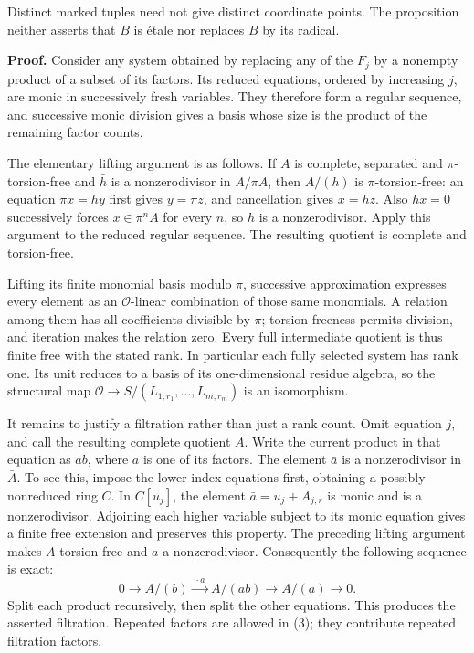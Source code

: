 \documentclass[
  british,
  10pt,
]{article}
\newcounter{none} %
\begin{document}
Distinct marked tuples need not give distinct coordinate points. The
proposition neither asserts that \(B\) is étale nor replaces \(B\) by
its radical.

\textbf{Proof.} Consider any system obtained by replacing any of the
\(F_j\) by a nonempty product of a subset of its factors. Its reduced
equations, ordered by increasing \(j\), are monic in successively fresh
variables. They therefore form a regular sequence, and successive monic
division gives a basis whose size is the product of the remaining factor
counts.

The elementary lifting argument is as follows. If \(A\) is complete,
separated and \(\pi\)-torsion-free and \(\bar h\) is a nonzerodivisor in
\(A/\pi A\), then \(A/(h)\) is \(\pi\)-torsion-free: an equation
\(\pi x=hy\) first gives \(y=\pi z\), and cancellation gives \(x=hz\).
Also \(hx=0\) successively forces \(x\in\pi^nA\) for every \(n\), so
\(h\) is a nonzerodivisor. Apply this argument to the reduced regular
sequence. The resulting quotient is complete and torsion-free.

Lifting its finite monomial basis modulo \(\pi\), successive
approximation expresses every element as an \(\mathcal O\)-linear
combination of those same monomials. A relation among them has all
coefficients divisible by \(\pi\); torsion-freeness permits division,
and iteration makes the relation zero. Every full intermediate quotient
is thus finite free with the stated rank. In particular each fully
selected system has rank one. Its unit reduces to a basis of its
one-dimensional residue algebra, so the structural map
\(\mathcal O\to S/(L_{1,r_1},\ldots,L_{m,r_m})\) is an isomorphism.

It remains to justify a filtration rather than just a rank count. Omit
equation \(j\), and call the resulting complete quotient \(A\). Write
the current product in that equation as \(ab\), where \(a\) is one of
its factors. The element \(\bar a\) is a nonzerodivisor in \(\bar A\).
To see this, impose the lower-index equations first, obtaining a
possibly nonreduced ring \(C\). In \(C[u_j]\), the element
\(\bar a=u_j+A_{j,r}\) is monic and is a nonzerodivisor. Adjoining each
higher variable subject to its monic equation gives a finite free
extension and preserves this property. The preceding lifting argument
makes \(A\) torsion-free and \(a\) a nonzerodivisor. Consequently the
following sequence is exact: \[
0\longrightarrow A/(b)
\xrightarrow{\;\cdot a\;}A/(ab)
\longrightarrow A/(a)\longrightarrow0.
\tag{3}
\] Split each product recursively, then split the other equations. This
produces the asserted filtration. Repeated factors are allowed in (3);
they contribute repeated filtration factors.
\end{document}

